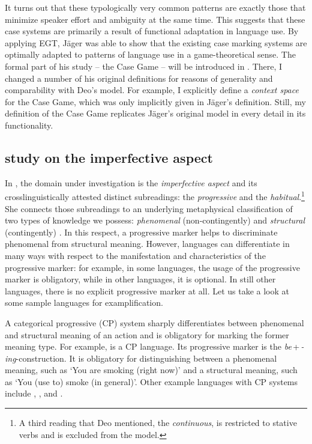 \documentclass[output=paper,hidelinks]{langscibook}
\begin{document}
It turns out that these typologically very common patterns are exactly those that minimize speaker effort and ambiguity at the same time. This suggests that these case systems are primarily a result of functional adaptation in language use. 
By applying EGT, Jäger was able to show that the existing case marking systems are optimally adapted to patterns of language use in a game-theoretical sense. The formal part of his study -- the Case Game -- will be introduced in . There, I changed a number of his original definitions for reasons of generality and comparability with Deo's model. For example, I explicitly define a \emph{context space} for the Case Game, which was only implicitly given in Jäger's definition. Still, my definition of the Case Game replicates Jäger's original model in every detail in its functionality. %


\subsection{ study on the imperfective aspect}
\label{sec:intro:prog}

In \citet{Deo_2015}, the domain under investigation is the \emph{imperfective aspect} and its crosslinguistically attested distinct subreadings: the \emph{progressive} and  the \emph{habitual}.\footnote{A third reading that Deo mentioned, the \emph{continuous}, is restricted to stative verbs and is excluded from the model.} 
She connects those subreadings to an underlying metaphysical classification of two types of knowledge we possess: \emph{phenomenal} (non-contingently) and \emph{structural} (contingently) \citep{goldsmith_82}. In this respect, a progressive marker helps to discriminate phenomenal from structural meaning. However, languages can differentiate in many ways with respect to the manifestation and characteristics of the progressive marker: for example, in some languages, the usage of the progressive marker is obligatory, while in other languages, it is optional. In still other languages, there is no explicit progressive marker at all. Let us take a look at some sample languages for examplification.

A categorical progressive (CP) system sharply differentiates between phenomenal and structural meaning of an action and is obligatory for marking the former meaning type. For example,  is a CP language. Its progressive marker is the \textit{be}\,+\,\textit{-ing}-construction. It is obligatory for distinguishing between a phenomenal meaning, such as `You are smoking (right now)' and a structural meaning, such as `You (use to) smoke (in general)'. Other example languages with CP systems include , , and .
\end{document}

